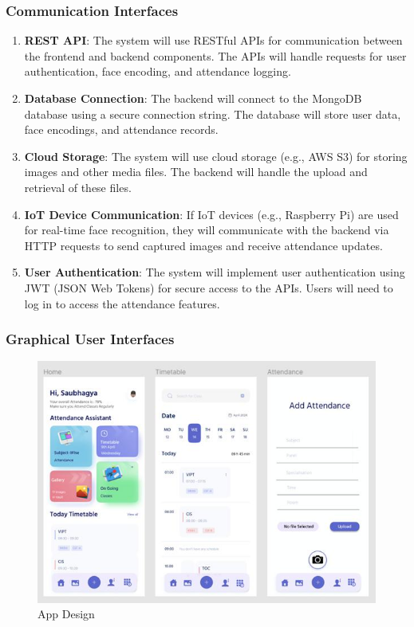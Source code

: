 \documentclass[openany]{report}
\begin{document}
\subsubsection{Communication Interfaces}
\begin{enumerate}
    \item \textbf{REST API}: The system will use RESTful APIs for communication between the frontend and backend components. The APIs will handle requests for user authentication, face encoding, and attendance logging.
    \item \textbf{Database Connection}: The backend will connect to the MongoDB database using a secure connection string. The database will store user data, face encodings, and attendance records.
    \item \textbf{Cloud Storage}: The system will use cloud storage (e.g., AWS S3) for storing images and other media files. The backend will handle the upload and retrieval of these files.
    \item \textbf{IoT Device Communication}: If IoT devices (e.g., Raspberry Pi) are used for real-time face recognition, they will communicate with the backend via HTTP requests to send captured images and receive attendance updates.
    \item \textbf{User Authentication}: The system will implement user authentication using JWT (JSON Web Tokens) for secure access to the APIs. Users will need to log in to access the attendance features.
\end{enumerate}
\subsubsection{Graphical User Interfaces}
\begin{figure}[H]
    \centering
    \includegraphics[width=.95\textwidth]{../imgs/app 2.jpg}
    \caption{App Design}
\end{figure}
\end{document}
